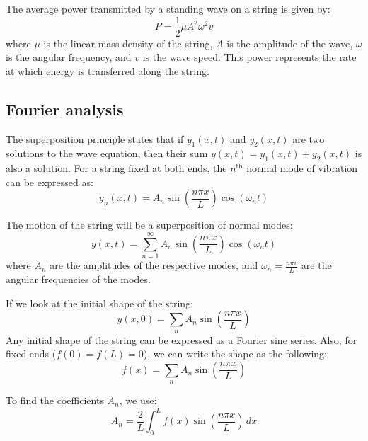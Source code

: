 \documentclass[11pt]{report}
\begin{document}
\begin{definition}
    The average power transmitted by a standing wave on a string is given by:
    $$
        \bar{P} = \frac{1}{2} \mu A^2 \omega^2 v
    $$
    where \( \mu \) is the linear mass density of the string, \( A \) is the amplitude of the wave, \( \omega \) is the angular frequency, and \( v \) is the wave speed. This power represents the rate at which energy is transferred along the string.
    
\end{definition}
\subsection{Fourier analysis}
\begin{definition}
    The superposition principle states that if $y_1(x,t)$ and $y_2(x,t)$ are two solutions to the wave equation, then their sum $y(x,t) = y_1(x,t) + y_2(x,t)$ is also a solution. For a string fixed at both ends, the $n^\text{th}$ normal mode of vibration can be expressed as:
    \begin{equation}
        y_n(x,t) = A_n \sin\left(\frac{n\pi x}{L}\right) \cos(\omega_n t)
    \end{equation}
    
    The motion of the string will be a superposition of normal modes:
    \begin{equation}
        y(x,t) = \sum_{n=1}^{\infty} A_n \sin\left(\frac{n\pi x}{L}\right) \cos(\omega_n t)
    \end{equation}
    where \( A_n \) are the amplitudes of the respective modes, and \( \omega_n = \frac{n\pi v}{L} \) are the angular frequencies of the modes.
\end{definition}

\begin{definition}
    If we look at the initial shape of the string:
    $$
        y(x,0) = \sum_n A_n \sin\left(\frac{n\pi x}{L}\right)
    $$
    Any initial shape of the string can be expressed as a Fourier sine series. Also, for fixed ends ($f(0)=f(L)=0$), we can write the shape as the following:
    $$
        f(x) = \sum_n A_n \sin\left(\frac{n\pi x}{L}\right)
    $$


    To find the coefficients \( A_n \), we use:
    \begin{equation}
        A_n = \frac{2}{L} \int_0^L f(x) \sin\left(\frac{n\pi x}{L}\right) \, dx
    \end{equation}
\end{definition}
\end{document}
